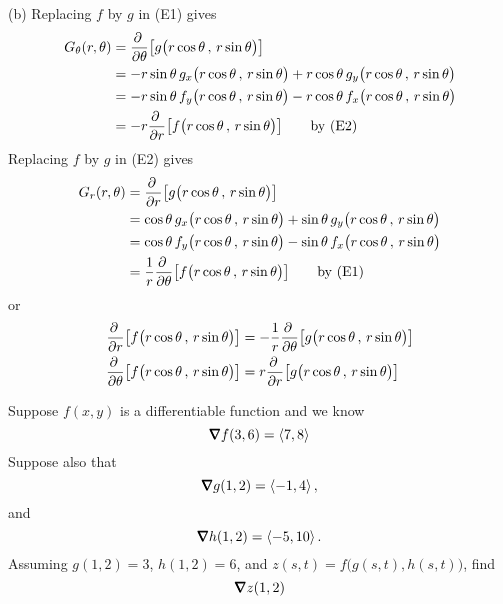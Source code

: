 \begin{solution}
(b) Replacing $f$ by $g$ in (E1) gives
\begin{align*}
G_\theta(r,\theta)
&=\pdiff{}{\theta}\big[g\big(r\cos\theta\,,\,r\sin\theta\big)\big] \\
&=-r\sin\theta\, g_x\big(r\cos\theta\,,\,r\sin\theta\big)
  +r\cos\theta\, g_y\big(r\cos\theta\,,\,r\sin\theta\big) \\
&=-r\sin\theta\, f_y\big(r\cos\theta\,,\,r\sin\theta\big)
  -r\cos\theta\, f_x\big(r\cos\theta\,,\,r\sin\theta\big) \\
&=-r \pdiff{}{r}\big[f\big(r\cos\theta\,,\,r\sin\theta\big)\big] 
\qquad\text{by (E2)}
\end{align*}
Replacing $f$ by $g$ in (E2) gives
\begin{align*}
G_r(r,\theta)
&=\pdiff{}{r}\big[g\big(r\cos\theta\,,\,r\sin\theta\big)\big] \\
&= \cos\theta\, g_x\big(r\cos\theta\,,\,r\sin\theta\big)
  +\sin\theta\, g_y\big(r\cos\theta\,,\,r\sin\theta\big) \\
&= \cos\theta\, f_y\big(r\cos\theta\,,\,r\sin\theta\big)
  -\sin\theta\, f_x\big(r\cos\theta\,,\,r\sin\theta\big) \\
&=\frac{1}{r} \pdiff{}{\theta}\big[f\big(r\cos\theta\,,\,r\sin\theta\big)\big]
\qquad\text{by (E1)}
\end{align*}
or
\begin{align*}
\pdiff{}{r}\big[f\big(r\cos\theta\,,\,r\sin\theta\big)\big]
&=-\frac{1}{r} \pdiff{}{\theta}\big[g\big(r\cos\theta\,,\,r\sin\theta\big)\big]
\\
\pdiff{}{\theta}\big[f\big(r\cos\theta\,,\,r\sin\theta\big)\big]
&=r\pdiff{}{r}\big[g\big(r\cos\theta\,,\,r\sin\theta\big)\big]
\end{align*}
\end{solution}

\begin{question}[M200 2003A] %
Suppose $f(x,y)$ is a differentiable function and we know
\begin{equation*}
\vnabla f(3,6)=\llt 7,8\rgt
\end{equation*}
Suppose also that
\begin{equation*}
\vnabla g(1,2)=\llt -1,4\rgt,
\end{equation*}
and
\begin{equation*}
\vnabla h(1,2)=\llt -5,10\rgt.
\end{equation*}
Assuming $g(1,2)=3$, $h(1,2)=6$, and $z(s,t)=f\big(g(s,t),h(s,t)\big)$,
find
\begin{equation*}
\vnabla z(1,2)
\end{equation*}
\end{question}

